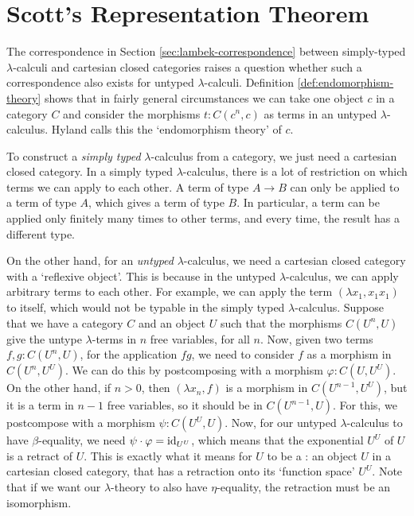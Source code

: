 \section{Scott's Representation Theorem}
The correspondence in Section \ref{sec:lambek-correspondence} between simply-typed $ \lambda $-calculi and cartesian closed categories raises a question whether such a correspondence also exists for untyped $ \lambda $-calculi. Definition \ref{def:endomorphism-theory} shows that in fairly general circumstances we can take one object $ c $ in a category $ C $ and consider the morphisms $ t: C(c^n, c) $ as terms in an untyped $ \lambda $-calculus. Hyland calls this the `endomorphism theory' of $ c $.

\begin{remark}
  To construct a \textit{simply typed} $ \lambda $-calculus from a category, we just need a cartesian closed category. In a simply typed $ \lambda $-calculus, there is a lot of restriction on which terms we can apply to each other. A term of type $ A \to B $ can only be applied to a term of type $ A $, which gives a term of type $ B $. In particular, a term can be applied only finitely many times to other terms, and every time, the result has a different type.

  On the other hand, for an \textit{untyped} $ \lambda $-calculus, we need a cartesian closed category with a `reflexive object'. This is because in the untyped $ \lambda $-calculus, we can apply arbitrary terms to each other. For example, we can apply the term $ (\lambda x_1, x_1 x_1) $ to itself, which would not be typable in the simply typed $ \lambda $-calculus. Suppose that we have a category $ C $ and an object $ U $ such that the morphisms $ C(U^n, U) $ give the untype $ \lambda $-terms in $ n $ free variables, for all $ n $. Now, given two terms $ f, g : C(U^n, U) $, for the application $ f g $, we need to consider $ f $ as a morphism in $ C(U^n, U^U) $. We can do this by postcomposing with a morphism $ \varphi: C(U, U^U) $. On the other hand, if $ n > 0 $, then $ (\lambda x_n, f) $ is a morphism in $ C(U^{n - 1}, U^U) $, but it is a term in $ n - 1 $ free variables, so it should be in $ C(U^{n - 1}, U) $. For this, we postcompose with a morphism $ \psi: C(U^U, U) $. Now, for our untyped $ \lambda $-calculus to have $ \beta $-equality, we need $ \psi \cdot \varphi = \text{id}_{U^U} $, which means that the exponential $ U^U $ of $ U $ is a retract of $ U $. This is exactly what it means for $ U $ to be a : an object $ U $ in a cartesian closed category, that has a retraction onto its `function space' $ U^U $. Note that if we want our $ \lambda $-theory to also have $ \eta $-equality, the retraction must be an isomorphism.


\end{remark}
